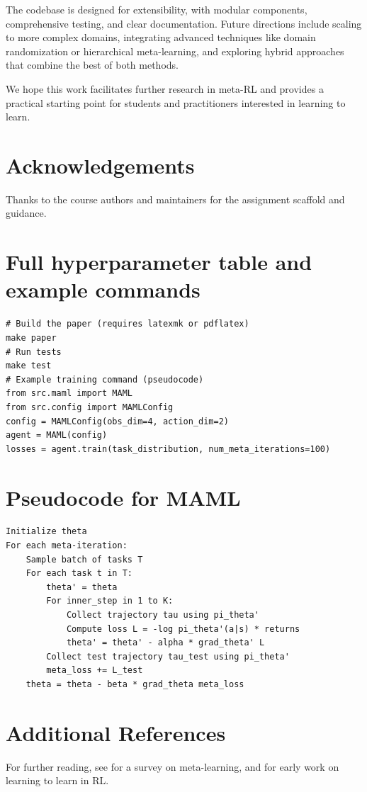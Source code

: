 \documentclass[11pt,a4paper]{article}
\begin{document}
The codebase is designed for extensibility, with modular components, comprehensive testing, and clear documentation. Future directions include scaling to more complex domains, integrating advanced techniques like domain randomization or hierarchical meta-learning, and exploring hybrid approaches that combine the best of both methods.

We hope this work facilitates further research in meta-RL and provides a practical starting point for students and practitioners interested in learning to learn.

\section*{Acknowledgements}
Thanks to the course authors and maintainers for the assignment scaffold and guidance.




\appendix
\section{Full hyperparameter table and example commands}
\begin{verbatim}
# Build the paper (requires latexmk or pdflatex)
make paper
# Run tests
make test
# Example training command (pseudocode)
from src.maml import MAML
from src.config import MAMLConfig
config = MAMLConfig(obs_dim=4, action_dim=2)
agent = MAML(config)
losses = agent.train(task_distribution, num_meta_iterations=100)
\end{verbatim}

\section{Pseudocode for MAML}
\begin{verbatim}
Initialize theta
For each meta-iteration:
    Sample batch of tasks T
    For each task t in T:
        theta' = theta
        For inner_step in 1 to K:
            Collect trajectory tau using pi_theta'
            Compute loss L = -log pi_theta'(a|s) * returns
            theta' = theta' - alpha * grad_theta' L
        Collect test trajectory tau_test using pi_theta'
        meta_loss += L_test
    theta = theta - beta * grad_theta meta_loss
\end{verbatim}

\section{Additional References}
For further reading, see \cite{hospedales2021meta} for a survey on meta-learning, and \cite{wang2016learning} for early work on learning to learn in RL.
\end{document}
